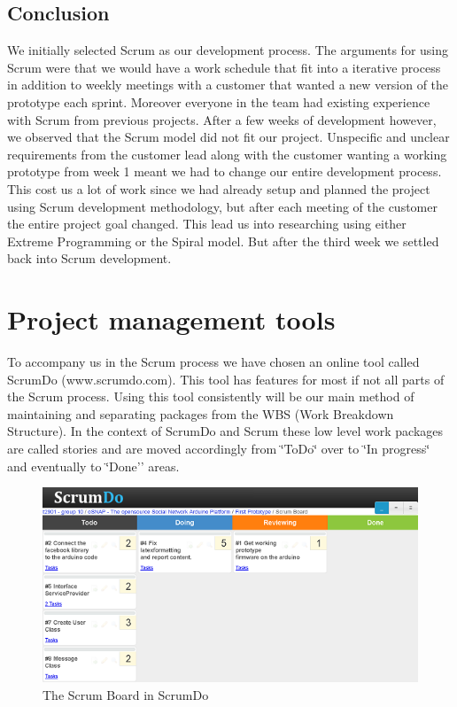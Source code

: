 \subsection{Conclusion}
We initially selected Scrum as our development process. The arguments  for using Scrum were that we would
have a work schedule that fit into a iterative process in addition to weekly meetings with a customer that
wanted a new version of the prototype each sprint. Moreover everyone in the team had existing experience 
with Scrum from previous projects. After a few weeks of development however, we observed that the Scrum
model did not fit our project. Unspecific and unclear requirements from the customer lead along with
the customer wanting a working prototype from week 1 meant we had to change our entire development
process. This cost us a lot of work since we had already setup and planned the project using Scrum 
development methodology, but after each meeting of the customer the entire project goal changed. This
lead us into researching using either Extreme Programming or the Spiral model. But after the third week we
settled back into Scrum development.

\section{Project management tools}

To accompany us in the Scrum process we have chosen an online tool
called ScrumDo (www.scrumdo.com). This tool has features for most
if not all parts of the Scrum process. Using this tool consistently
will be our main method of maintaining and separating packages from
the WBS (Work Breakdown Structure). In the context of ScrumDo and
Scrum these low level work packages are called stories and are moved
accordingly from \char`\"{}ToDo\char`\"{} over to \char`\"{}In progress\char`\"{}
and eventually to \char`\"{}Done'' areas.
	
\begin{figure}[h!]
\centering \includegraphics{img/management-scrumdo} \caption{The Scrum Board in ScrumDo}
\label{fig:management-scrumdo}
\end{figure}


